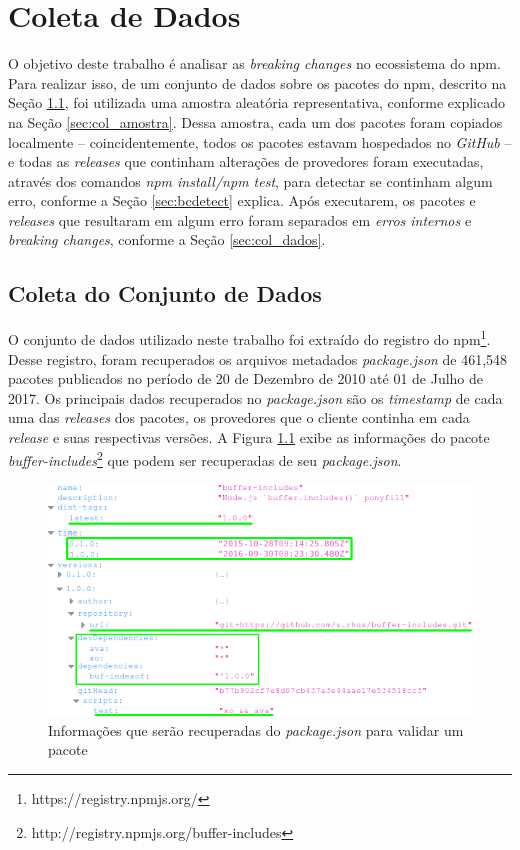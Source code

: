 \chapter{Coleta de Dados}
\label{cap:metodologia}

O objetivo deste trabalho é analisar as \textit{breaking changes} no ecossistema do \gls{npm}. Para realizar isso, de um conjunto de dados sobre os pacotes do \gls{npm}, descrito na Seção \ref{sec:col_base}, foi utilizada uma amostra aleatória representativa, conforme explicado na Seção \ref{sec:col_amostra}. Dessa amostra, cada um dos pacotes foram copiados localmente -- coincidentemente, todos os pacotes estavam hospedados no \textit{GitHub} -- e todas as \textit{releases} que continham alterações de provedores foram executadas, através dos comandos \textit{npm install/npm test}, para detectar se continham algum erro, conforme a Seção \ref{sec:bcdetect} explica. Após executarem, os pacotes e \textit{releases} que resultaram em algum erro foram separados em \textit{erros internos} e \textit{breaking changes}, conforme a Seção \ref{sec:col_dados}.

\section{Coleta do Conjunto de Dados}
\label{sec:col_base}
O conjunto de dados utilizado neste trabalho foi extraído do registro do \gls{npm}\footnote{https://registry.npmjs.org/}. Desse registro, foram recuperados os arquivos metadados \textit{package.json} de 461,548 pacotes publicados no período de 20 de Dezembro de 2010 até 01 de Julho de 2017. Os principais dados recuperados no \textit{package.json} são os \textit{timestamp} de cada uma das \textit{releases} dos pacotes, os provedores que o cliente continha em cada \textit{release} e suas respectivas versões. A Figura \ref{fig:package_json} exibe as informações do pacote \textit{buffer-includes}\footnote{http://registry.npmjs.org/buffer-includes} que podem ser recuperadas de seu \textit{package.json}.

\begin{figure}
    \centering
    \includegraphics[scale=0.5]{figuras/package_json.png}
    \caption{Informações que serão recuperadas do \textit{package.json} para validar um pacote}
    \label{fig:package_json}
\end{figure}{}

